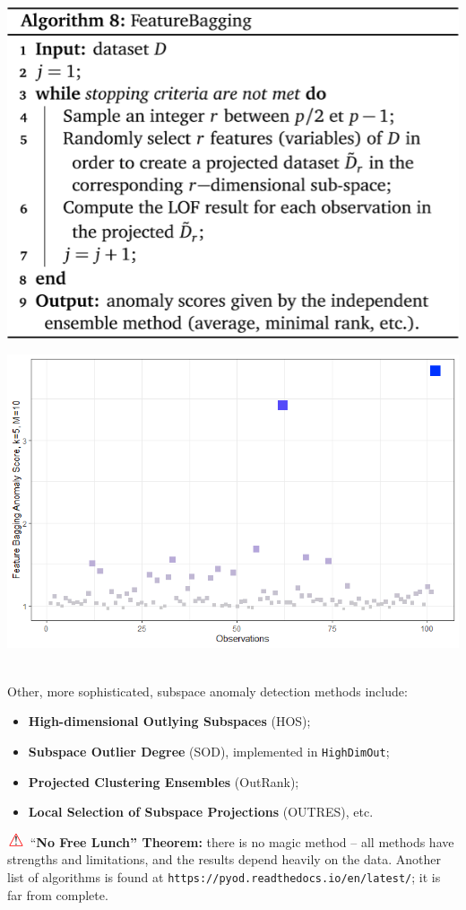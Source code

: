 \documentclass[20pt,landscape,footrule,headrule]{foils}
\newcommand{\newl}{\newline\newline}
\newcommand\Warning{%
 \makebox[1.4em][c]{%
 \makebox[0pt][c]{\raisebox{.1em}{!}}%
 \makebox[0pt][c]{\color{red}\Large$\bigtriangleup$}}}%
\begin{document}
{{\newpage\ \begin{center}
\includegraphics[height=0.9\textheight]{Images/Algorithm8}
\end{center}
\newpage 
\newpage \begin{center}
\includegraphics[width=\textwidth]{Images/FBOD}
\end{center}\newpage\ \\ \noindent 
\noindent Other, more sophisticated, subspace anomaly detection methods include:
\begin{itemize}
\item \textbf{High-dimensional Outlying Subspaces} (HOS); \item \textbf{Subspace Outlier Degree} (SOD), implemented in  \texttt{HighDimOut}; 
\item \textbf{Projected Clustering Ensembles} (OutRank); 
\item \textbf{Local Selection of Subspace Projections} (OUTRES), etc.
\end{itemize}
 $\Warning$ ``\textbf{No Free Lunch'' Theorem:} there is no magic method --  all methods have strengths and limitations, and the results depend heavily on the data. 
\newl Another list of algorithms is found at \texttt{https://pyod.readthedocs.io/en/latest/}; it is far from complete. 

}}
\end{document}
